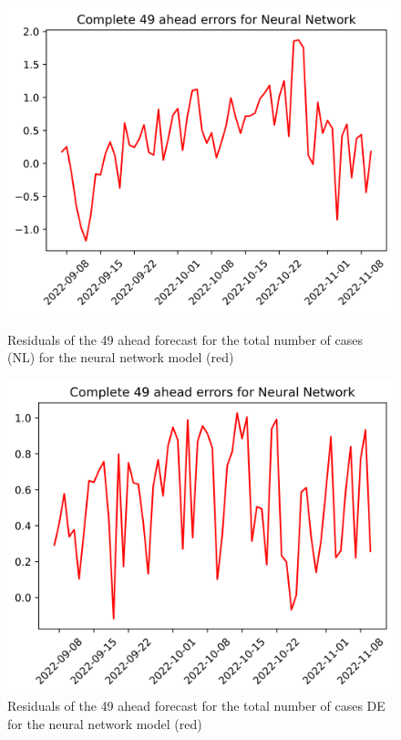 \begin{figure}

\begin{minipage}{.45\textwidth}
  \centering
  \includegraphics[width=\linewidth]{pics/49_ah/49_ahead_errors_Neural Network.png}
  \caption{Residuals of the 49 ahead forecast for the total number of cases (NL) for the neural network model (red)}
  \label{fig:tot_cases_error_49_nn}
\end{minipage}
\begin{minipage}{.45\textwidth}
  \centering
  \includegraphics[width=\linewidth]{pics/49_ah/DE_49_ahead_errors_Neural Network.png}
  \caption{Residuals of the 49 ahead forecast for the total number of cases DE for the neural network model (red)}
  \label{fig:tot_cases_error_49_nn_DE}
\end{minipage}

\end{figure}
